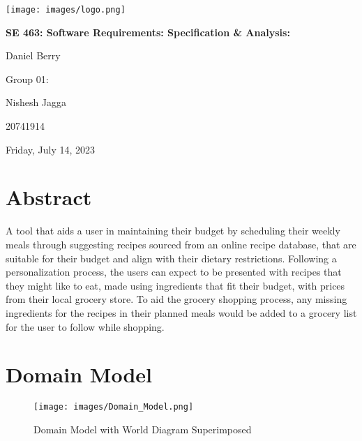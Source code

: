 \documentclass[11pt, letterpaper]{report}
\begin{document}
\begin{titlepage}
    \centering
    \texttt{[image: images/logo.png]}\par
    \vspace{1cm}
    {\bfseries SE 463: Software Requirements: Specification \& Analysis: \par}
    \vspace{0.5cm}
    {Daniel Berry \par}
    \vspace{5cm}
    {Group 01: \par}
    {Nishesh Jagga \par}
    {20741914 \par}
    \vspace{5cm}
    {Friday, July 14, 2023 \par}
\end{titlepage}
\restoregeometry

\tableofcontents
\thispagestyle{empty}
\clearpage

\pagestyle{fancy}
\fancyhf{}
\rfoot{\thepage}
\renewcommand{\headrulewidth}{0pt}

\chapter{Abstract}
\setcounter{page}{1}
A tool that aids a user in maintaining their budget by scheduling their weekly meals through suggesting recipes sourced from an online recipe database, that are suitable for their budget and align with their dietary restrictions. Following a personalization process, the users can expect to be presented with recipes that they might like to eat, made using ingredients that fit their budget, with prices from their local grocery store. To aid the grocery shopping process, any missing ingredients for the recipes in their planned meals would be added to a grocery list for the user to follow while shopping.

\chapter{Domain Model}
\begin{figure}[h]
    \centering
    \texttt{[image: images/Domain\_Model.png]}
    \caption{Domain Model with World Diagram Superimposed}
\end{figure}
\end{document}

